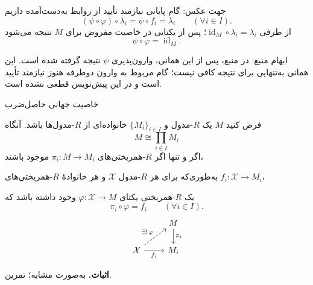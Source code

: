 \begin{frame}[t]{جهت عکس: گام پایانی نیازمند تأیید}
    \label{lec08:reverse-inverse-pending}
    از روابط به‌دست‌آمده داریم
    \[
        (\psi\circ\varphi)\circ\lambda_i
        =\psi\circ f_i=\lambda_i
        \qquad(\forall i\in I).
    \]
    از طرفی $\operatorname{id}_M\circ\lambda_i=\lambda_i$؛
    پس از یکتایی در خاصیت مفروض برای $M$ نتیجه می‌شود
    \[
        \psi\circ\varphi=\operatorname{id}_M.
    \]
    \begin{block}{ابهام منبع: }
        در منبع، پس از این همانی، وارون‌پذیری $\psi$ نتیجه گرفته شده است.
        این همانی به‌تنهایی برای نتیجه کافی نیست؛ گام مربوط به وارون دوطرفه
        هنوز نیازمند تأیید است و در این پیش‌نویس قطعی نشده است.
    \end{block}
\end{frame}

\begin{frame}[t]{خاصیت جهانی حاصل‌ضرب}
    \label{lec08:product-universal-property}
    \begin{theorem}
        فرض کنید $M$ یک $R$-مدول و $\{M_i\}_{i\in I}$ خانواده‌ای از $R$-مدول‌ها باشد.
        آنگاه
        \[
            M\cong\prod_{i\in I}M_i
        \]
        اگر و تنها اگر $R$-همریختی‌های $\pi_i:M\to M_i$ موجود باشند،\par
        به‌طوری‌که برای هر $R$-مدول $\mathcal{X}$ و هر خانوادهٔ
        $R$-همریختی‌های $f_i:\mathcal{X}\to M_i$،\par
        یک $R$-همریختی یکتای
        $\varphi:\mathcal{X}\to M$ وجود داشته باشد که
        \[
            \pi_i\circ\varphi=f_i\qquad(\forall i\in I).
        \]
        \[
            \begin{tikzcd}[ampersand replacement=\&]
                \& M\arrow[d,"\pi_i"]\\
                \mathcal{X}\arrow[ur,dashed,"\exists!\,\varphi"]
                \arrow[r,"f_i" swap]\& M_i
            \end{tikzcd}
        \]
    \end{theorem}
    \textbf{اثبات.} به‌صورت مشابه؛ تمرین.
\end{frame}

